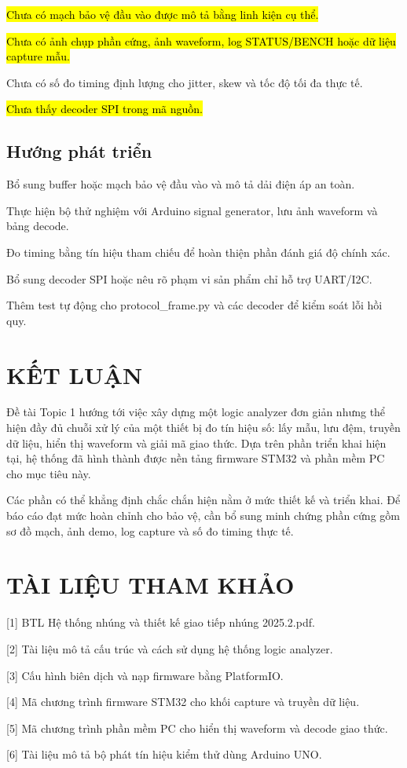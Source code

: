 \hl{Chưa có mạch bảo vệ đầu vào được mô tả bằng linh kiện cụ thể.}

\hl{Chưa có ảnh chụp phần cứng, ảnh waveform, log STATUS/BENCH hoặc dữ liệu capture mẫu.}

Chưa có số đo timing định lượng cho jitter, skew và tốc độ tối đa thực tế.

\hl{Chưa thấy decoder SPI trong mã nguồn.}

\section{Hướng phát triển}\label{hux1b0ux1edbng-phuxe1t-triux1ec3n}

Bổ sung buffer hoặc mạch bảo vệ đầu vào và mô tả dải điện áp an toàn.

Thực hiện bộ thử nghiệm với Arduino signal generator, lưu ảnh waveform và bảng decode.

Đo timing bằng tín hiệu tham chiếu để hoàn thiện phần đánh giá độ chính xác.

Bổ sung decoder SPI hoặc nêu rõ phạm vi sản phẩm chỉ hỗ trợ UART/I2C.

Thêm test tự động cho protocol\_frame.py và các decoder để kiểm soát lỗi hồi quy.

\chapter{KẾT LUẬN}\label{kux1ebft-luux1eadn}

Đề tài Topic 1 hướng tới việc xây dựng một logic analyzer đơn giản nhưng thể hiện đầy đủ chuỗi xử lý của một thiết bị đo tín hiệu số: lấy mẫu, lưu đệm, truyền dữ liệu, hiển thị waveform và giải mã giao thức. Dựa trên phần triển khai hiện tại, hệ thống đã hình thành được nền tảng firmware STM32 và phần mềm PC cho mục tiêu này.

Các phần có thể khẳng định chắc chắn hiện nằm ở mức thiết kế và triển khai. Để báo cáo đạt mức hoàn chỉnh cho bảo vệ, cần bổ sung minh chứng phần cứng gồm sơ đồ mạch, ảnh demo, log capture và số đo timing thực tế.

\chapter{TÀI LIỆU THAM KHẢO}\label{tuxe0i-liux1ec7u-tham-khux1ea3o}

{[}1{]} BTL Hệ thống nhúng và thiết kế giao tiếp nhúng 2025.2.pdf.

{[}2{]} Tài liệu mô tả cấu trúc và cách sử dụng hệ thống logic analyzer.

{[}3{]} Cấu hình biên dịch và nạp firmware bằng PlatformIO.

{[}4{]} Mã chương trình firmware STM32 cho khối capture và truyền dữ liệu.

{[}5{]} Mã chương trình phần mềm PC cho hiển thị waveform và decode giao thức.

{[}6{]} Tài liệu mô tả bộ phát tín hiệu kiểm thử dùng Arduino UNO.
